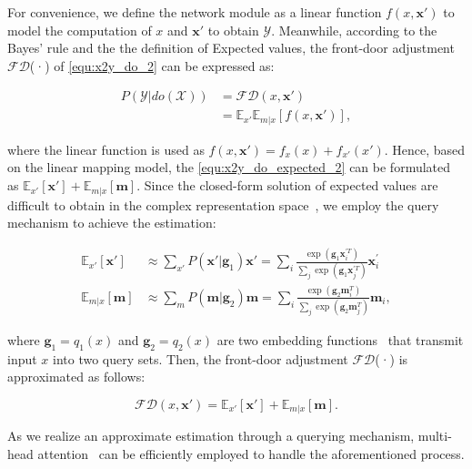 For convenience, we define the network module as a linear function $f(x,\boldsymbol{x'})$ to model the computation of $x$ and $\boldsymbol{x'}$ to obtain $\mathcal{Y}$. Meanwhile, according to the Bayes' rule and the the definition of Expected values, the front-door adjustment $\mathcal{FD}$(·) of \cref{equ:x2y_do_2} can be expressed as:
\begin{small} 
\begin{align}
    P(\mathcal{Y}|do(\mathcal{X})) &= \mathcal{FD}(x,\boldsymbol{x}') \label{equ:x2y_do_expected_1}\\
    &= \mathbb{E}_{x'}\mathbb{E}_{m|x}[f(x,\boldsymbol{x'})] \label{equ:x2y_do_expected_2},
\end{align}
\end{small}
where the linear function is used as $f(x,\boldsymbol{x'}) = f_x(x) + f_{x'}(x')$. Hence, based on the linear mapping model, the \cref{equ:x2y_do_expected_2} can be formulated as $\mathbb{E}_{x'}[\boldsymbol{x'}] + \mathbb{E}_{m|x}[\boldsymbol{m}]$. Since the closed-form solution of expected values are difficult to obtain in the complex representation space~\cite{wang2024vision}, we employ the query mechanism to achieve the estimation:
\begin{small} 
\begin{align}
    \mathbb{E}_{x'}[\boldsymbol{x}'] &\approx \sum_{x'}P(\boldsymbol{x}'|\boldsymbol{g}_1)\boldsymbol{x}' = \sum_{i} \frac{\exp \left(\boldsymbol{g}_{1} \boldsymbol{x}_{i}^{\prime T}\right)}{\sum_{j} \exp \left(\boldsymbol{g}_{1} \boldsymbol{x}_{j}^{\prime T}\right)} \boldsymbol{x}_{i}^{\prime} \label{equ:query1} \\
    \mathbb{E}_{m|x}[\boldsymbol{m}] &\approx \sum_{m}P(\boldsymbol{m}|\boldsymbol{g}_2)\boldsymbol{m} = \sum_{i} \frac{\exp \left(\boldsymbol{g}_{2} \boldsymbol{m}_{i}^{T}\right)}{\sum_{j} \exp \left(\boldsymbol{g}_{2} \boldsymbol{m}_{j}^{T}\right)} \boldsymbol{m}_{i} \label{equ:query2},
\end{align}
\end{small}
where $\boldsymbol{g}_1 = q_1(x)$ and $\boldsymbol{g}_2 = q_2(x)$ are two embedding functions~\cite{yang2021deconfounded,liu2023cross} that transmit input $x$ into two query sets. Then, the front-door adjustment $\mathcal{FD}$(·) is approximated as follows:
\begin{small} 
\begin{equation}
\label{equ:fd_final}
    \mathcal{FD}(x,\boldsymbol{x}') = \mathbb{E}_{x'}[\boldsymbol{x}'] + \mathbb{E}_{m|x}[\boldsymbol{m}].
\end{equation}
\end{small}
As we realize an approximate estimation through a querying mechanism, multi-head attention~\cite{vaswani2017attention} can be efficiently employed to handle the aforementioned process.


